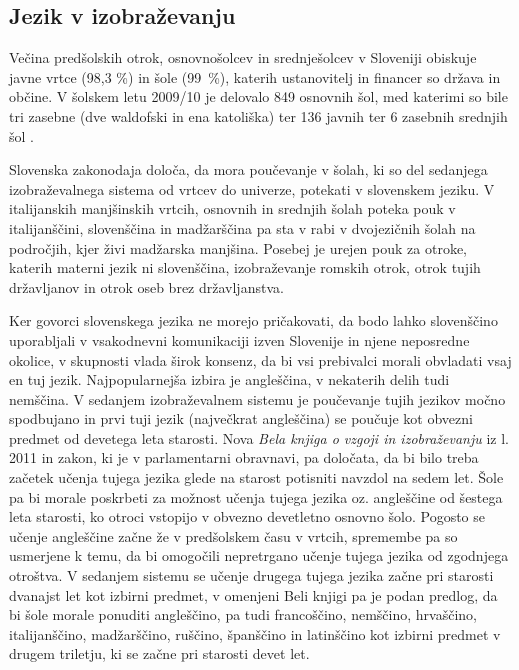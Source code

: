 \begin{multicols}{2}
\subsection{Jezik v izobraževanju}

Večina predšolskih otrok, osnovnošolcev in srednješolcev v Sloveniji obiskuje javne vrtce (98,3 \%) in šole (99~\%), katerih ustanovitelj in financer so država in občine. V šolskem letu 2009/10 je delovalo 849 osnovnih šol, med katerimi so bile tri zasebne (dve wal\-dofski in ena katoliška) ter 136 javnih ter 6 zasebnih srednjih šol \cite{Eurydice1}.

Slovenska zako\-nodaja določa, da mora poučevanje v šolah, ki so del sedanjega izobraževalnega sistema od vrtcev do univerze, potekati v slovenskem jeziku. V itali\-janskih manjšinskih vrtcih, osnovnih in srednjih šolah poteka pouk v itali\-janščini, slovenščina in madžarščina pa sta v rabi v dvojezičnih šolah na področjih, kjer živi madžarska manjšina. Posebej je urejen pouk za otroke, katerih materni jezik ni slovenščina, izobraževanje romskih otrok, otrok tujih držav\-ljanov in otrok oseb brez držav\-ljanstva.

Ker go\-vorci slovenskega jezika ne morejo pričakovati, da bodo lahko slovenščino uporab\-ljali v vsakodnevni komunikaciji izven Slovenije in njene neposredne okolice, v skupnosti vlada širok konsenz, da bi vsi prebivalci morali obvladati vsaj en tuj jezik. Naj\-popular\-nej\-ša izbira je angleščina, v nekaterih delih tudi nemščina. V sedanjem izobraževalnem sistemu je poučevanje tujih jezikov močno spodbujano in prvi tuji jezik (naj\-večkrat angleščina) se poučuje kot obvezni predmet od devetega leta starosti. Nova \textit{Bela knjiga o vzgoji in izobraževanju} iz l. 2011 \cite{BK1} in zakon, ki je v parlamentarni obravnavi, pa določata, da bi bilo treba začetek učenja tujega jezika glede na starost potisniti navzdol na sedem let. Šole pa bi morale poskrbeti za možnost učenja tujega jezika oz. angleščine od šestega leta starosti, ko otroci vstopijo v obvezno devetletno osnovno šolo. Pogosto se učenje angleščine začne že v predšolskem času v vrtcih, spremembe pa so usmerjene k temu, da bi omogočili nepretrgano učenje tujega jezika od zgodnjega otroštva. V sedanjem sistemu se učenje drugega tujega jezika začne pri starosti dvanaj\-st let kot izbirni predmet, v omenjeni Beli knjigi pa je podan predlog, da bi šole morale ponuditi angleščino, pa tudi francoščino, nemščino, hrvaščino, itali\-janščino, madžarščino, ruščino, španščino in latinščino kot izbirni predmet v drugem triletju, ki se začne pri starosti devet let.


\end{multicols}
